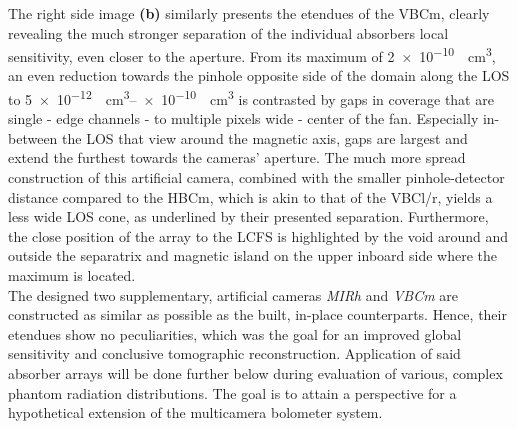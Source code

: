         The right side image \textbf{(b)} similarly presents the etendues of the VBCm, clearly revealing the much stronger separation of the individual absorbers local sensitivity, even closer to the aperture. From its maximum of \SI{2e-10}{\per\cubic\centi\meter}, an even reduction towards the pinhole opposite side of the domain along the LOS to \SIrange{5e-12}{e-10}{\per\cubic\centi\meter} is contrasted by gaps in coverage that are single - edge channels - to multiple pixels wide - center of the fan. Especially in-between the LOS that view around the magnetic axis, gaps are largest and extend the furthest towards the cameras' aperture. The much more spread construction of this artificial camera, combined with the smaller pinhole-detector distance compared to the HBCm, which is akin to that of the VBCl/r, yields a less wide LOS cone, as underlined by their presented separation. Furthermore, the close position of the array to the LCFS is highlighted by the void around and outside the separatrix and magnetic island on the upper inboard side where the maximum is located.\\%
        The designed two supplementary, artificial cameras \textit{MIRh} and \textit{VBCm} are constructed as similar as possible as the built, in-place counterparts. Hence, their etendues show no peculiarities, which was the goal for an improved global sensitivity and conclusive tomographic reconstruction. Application of said absorber arrays will be done further below during evaluation of various, complex phantom radiation distributions. The goal is to attain a perspective for a hypothetical extension of the multicamera bolometer system.\\%
%
        \newline%
